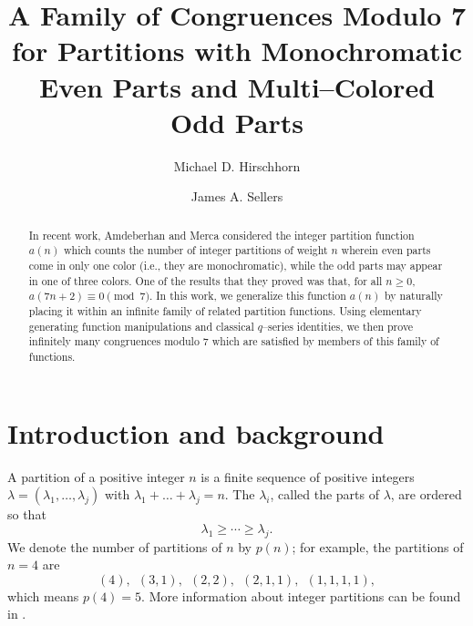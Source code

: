 \documentclass[10pt, reqno]{amsart}
\title[]{A Family of Congruences Modulo 7 for Partitions with Monochromatic Even Parts and Multi--Colored Odd Parts}
\author{Michael D. Hirschhorn}
\author{James A. Sellers}
\date{}
\theoremstyle{theorem}
\theoremstyle{definition}
\theoremstyle{example}
\begin{document}

\maketitle

\begin{abstract}
In recent work, Amdeberhan and Merca considered the integer partition function $a(n)$ which counts the number of integer partitions of weight $n$ wherein even parts come in only one color (i.e., they are monochromatic), while the odd parts may appear in one of three colors.  One of the results that they proved was that, for all $n\geq 0$, $a(7n+2) \equiv 0 \pmod{7}$.  In this work, we generalize this function $a(n)$ by naturally placing it within an infinite family of related partition functions.  Using elementary generating function manipulations and classical $q$--series identities, we then prove infinitely many congruences modulo 7 which are satisfied by members of this family of functions.  
\end{abstract}

\section{Introduction and background}
\label{sec:intro}
A partition of a positive integer $n$ is a finite sequence of positive integers $\lambda = (\lambda_1, \ldots, \lambda_j)$ with $\lambda_1 + \dots + \lambda_j = n$.
The $\lambda_i$, called the parts of $\lambda$, are ordered so that 
\begin{equation}
\label{ordinary_ordering}
\lambda_1 \ge \cdots \ge \lambda_j.
\end{equation}  We denote the number of partitions of $n$ by $p(n)$; for example, the partitions of $n=4$ are 
$$(4), \ \ (3,1), \ \ (2,2), \ \ (2,1,1), \ \ (1,1,1,1),$$
which means $p(4) = 5$.  More information about integer partitions can be found in \cite{AE}.  
\end{document}
